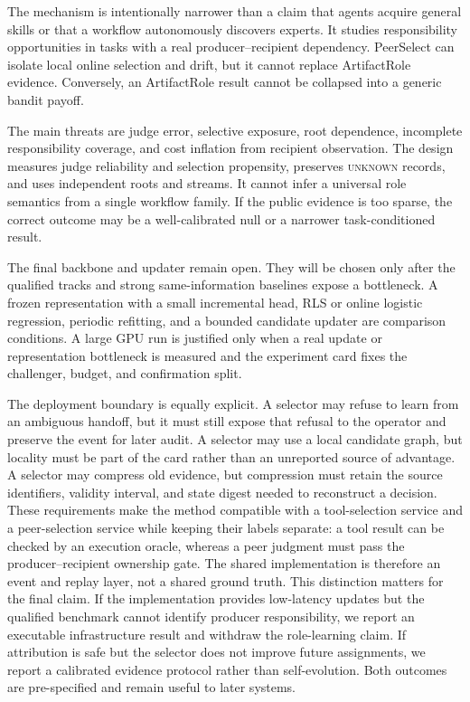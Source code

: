 \documentclass[sigconf,anonymous]{aamas}
\newcommand{\unknown}{\textsc{unknown}}
\begin{document}
The mechanism is intentionally narrower than a claim that agents acquire general skills or that a workflow autonomously discovers experts. It studies responsibility opportunities in tasks with a real producer--recipient dependency. PeerSelect can isolate local online selection and drift, but it cannot replace ArtifactRole evidence. Conversely, an ArtifactRole result cannot be collapsed into a generic bandit payoff.

The main threats are judge error, selective exposure, root dependence, incomplete responsibility coverage, and cost inflation from recipient observation. The design measures judge reliability and selection propensity, preserves \unknown{} records, and uses independent roots and streams. It cannot infer a universal role semantics from a single workflow family. If the public evidence is too sparse, the correct outcome may be a well-calibrated null or a narrower task-conditioned result.

The final backbone and updater remain open. They will be chosen only after the qualified tracks and strong same-information baselines expose a bottleneck. A frozen representation with a small incremental head, RLS or online logistic regression, periodic refitting, and a bounded candidate updater are comparison conditions. A large GPU run is justified only when a real update or representation bottleneck is measured and the experiment card fixes the challenger, budget, and confirmation split.

The deployment boundary is equally explicit. A selector may refuse to learn from an ambiguous handoff, but it must still expose that refusal to the operator and preserve the event for later audit. A selector may use a local candidate graph, but locality must be part of the card rather than an unreported source of advantage. A selector may compress old evidence, but compression must retain the source identifiers, validity interval, and state digest needed to reconstruct a decision. These requirements make the method compatible with a tool-selection service and a peer-selection service while keeping their labels separate: a tool result can be checked by an execution oracle, whereas a peer judgment must pass the producer--recipient ownership gate. The shared implementation is therefore an event and replay layer, not a shared ground truth. This distinction matters for the final claim. If the implementation provides low-latency updates but the qualified benchmark cannot identify producer responsibility, we report an executable infrastructure result and withdraw the role-learning claim. If attribution is safe but the selector does not improve future assignments, we report a calibrated evidence protocol rather than self-evolution. Both outcomes are pre-specified and remain useful to later systems.
\end{document}
